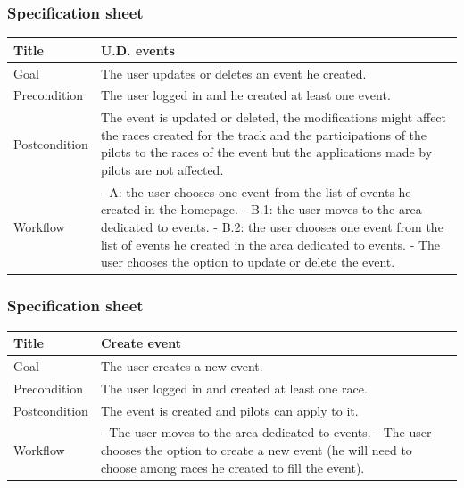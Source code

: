 \documentclass{beamer}
\begin{document}
\begin{frame}
    \frametitle{Specification sheet}
    \begin{table}
        \tiny
        \begin{tabular}{|p{2cm}|p{6cm}|}
        \hline
        Title & \textbf{U.D. events} \\
        \hline
        Goal & The user updates or deletes an event he created. \\
        \hline
        Precondition & The user logged in and he created at least one event. \\
        \hline
        Postcondition & The event is updated or deleted, the modifications might affect the races created for the track 
        and the participations of the pilots to the races of the event but the applications made by pilots are not affected. \\
        \hline
        Workflow &
        - A: the user chooses one event from the list of events he created in the homepage. \newline
        - B.1: the user moves to the area dedicated to events. \newline
        - B.2: the user chooses one event from the list of events he created in the area dedicated to events. \newline
        - The user chooses the option to update or delete the event. \\
        \hline
        \end{tabular}
\end{table}
\end{frame}


\begin{frame}
    \frametitle{Specification sheet}
    \begin{table}
        \tiny
        \begin{tabular}{|p{2cm}|p{6cm}|}
        \hline
        Title & \textbf{Create event} \\
        \hline
        Goal & The user creates a new event. \\
        \hline
        Precondition & The user logged in and created at least one race.\\
        \hline
        Postcondition & The event is created and pilots can apply to it. \\
        \hline
        Workflow &
        - The user moves to the area dedicated to events. \newline
        - The user chooses the option to create a new event (he will need to choose among races he created
        to fill the event). \\
        \hline
        \end{tabular}
\end{table}
\end{frame}
\end{document}
